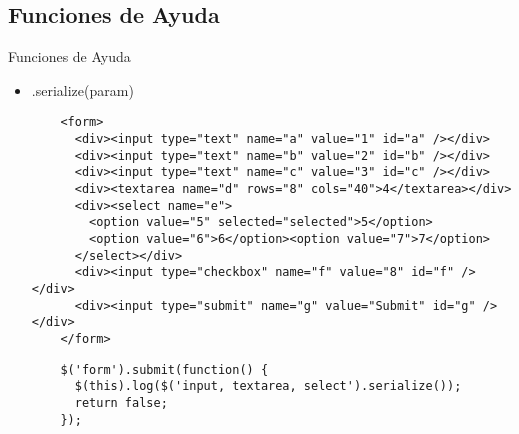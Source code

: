 \subsection{Funciones de Ayuda} %

\begin{frame}[fragile]{Funciones de Ayuda} %
\begin{itemize}
    \item .serialize(param)
    \begin{lstlisting}
    <form>
      <div><input type="text" name="a" value="1" id="a" /></div>
      <div><input type="text" name="b" value="2" id="b" /></div>
      <div><input type="text" name="c" value="3" id="c" /></div>
      <div><textarea name="d" rows="8" cols="40">4</textarea></div>
      <div><select name="e">
        <option value="5" selected="selected">5</option>
        <option value="6">6</option><option value="7">7</option>
      </select></div>
      <div><input type="checkbox" name="f" value="8" id="f" /></div>
      <div><input type="submit" name="g" value="Submit" id="g" /></div>
    </form>
    \end{lstlisting}
    \begin{lstlisting}
    $('form').submit(function() {
      $(this).log($('input, textarea, select').serialize());
      return false;
    });
    \end{lstlisting}
\end{itemize}
\end{frame}


